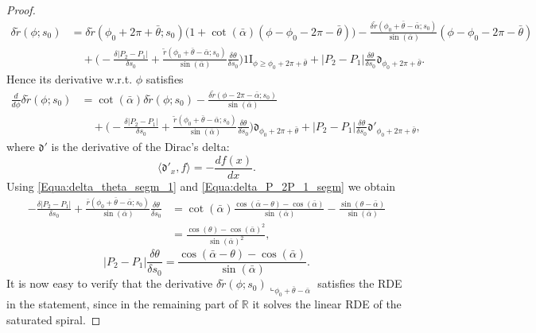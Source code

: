 \documentclass[10pt,a4paper]{amsart}
\newcommand{\Diracd}{\mathfrak{d}}
\newcommand{\R}{\mathbb{R}}
\newcommand{\ind}{1\!\!\mathrm{I}}
\newcommand{\rest}{\llcorner}
\begin{document}
\begin{proof}
\begin{align*}
\delta \tilde r(\phi;s_0) &= \delta \tilde r(\phi_0 + 2\pi + \bar\theta;s_0) \big( 1 + \cot(\bar \alpha) (\phi - \phi_0 - 2\pi - \bar \theta) \big) - \frac{\delta \tilde r(\phi_0 + \bar \theta - \bar \alpha;s_0)}{\sin(\bar \alpha)} (\phi - \phi_0 - 2\pi - \bar \theta) \\
& \quad + \bigg( - \frac{\delta |P_2 - P_1|}{\delta s_0} + \frac{\tilde r(\phi_0 + \bar \theta - \bar \alpha;s_0)}{\sin(\bar \alpha)} \frac{\delta \theta}{\delta s_0} \bigg) \ind_{\phi \geq \phi_0 + 2\pi + \bar \theta} + |P_2 - P_1| \frac{\delta \theta}{\delta s_0} \Diracd_{\phi_0 + 2\pi + \bar \theta}.
\end{align*}
Hence its derivative w.r.t. $\phi$ satisfies
\begin{align*}
\frac{d}{d\phi} \delta \tilde r(\phi;s_0) &= \cot(\bar \alpha) \delta \tilde r(\phi;s_0) - \frac{\delta \tilde r(\phi - 2\pi - \bar \alpha;s_0)}{\sin(\bar \alpha)} \\
& \quad + \bigg( - \frac{\delta |P_2 - P_1|}{\delta s_0} + \frac{\tilde r(\phi_0 + \bar \theta - \bar \alpha;s_0)}{\sin(\bar \alpha)} \frac{\delta \theta}{\delta s_0}  \bigg) \Diracd_{\phi_0 + 2\pi + \bar\theta} + |P_2 - P_1| \frac{\delta \theta}{\delta s_0} \Diracd'_{\phi_0 + 2\pi + \bar \theta},
\end{align*}
where $\Diracd'$ is the derivative of the Dirac's delta:
\begin{equation*}
\langle \Diracd'_x, f \rangle = - \frac{df(x)}{dx}.
\end{equation*}
Using \eqref{Equa:delta_theta_segm_1} and \eqref{Equa:delta_P_2P_1_segm} we obtain
\begin{align*}
- \frac{\delta |P_2 - P_1|}{\delta s_0} + \frac{\bar r(\phi_0 + \bar \theta - \bar \alpha;s_0)}{\sin(\bar \alpha)} \frac{\delta \theta}{\delta s_0} &= \cot(\bar \alpha) \frac{\cos(\bar \alpha - \theta) - \cos(\bar \alpha)}{\sin(\bar \alpha)} - \frac{\sin(\theta - \bar \alpha)}{\sin(\bar \alpha)} \\
&= \frac{\cos(\theta) - \cos(\bar \alpha)^2}{\sin(\bar \alpha)^2},
\end{align*}
\begin{equation*}
|P_2 - P_1| \frac{\delta \theta}{\delta s_0} = \frac{\cos(\bar \alpha - \theta) - \cos(\bar \alpha)}{\sin(\bar \alpha)}.
\end{equation*}
It is now easy to verify that the derivative $\delta \tilde r(\phi;s_0) \rest_{\phi_0 + \bar \theta - \bar \alpha}$ satisfies the RDE in the statement, since in the remaining part of $\R$ it solves the linear RDE of the saturated spiral.
\end{proof}
\end{document}
